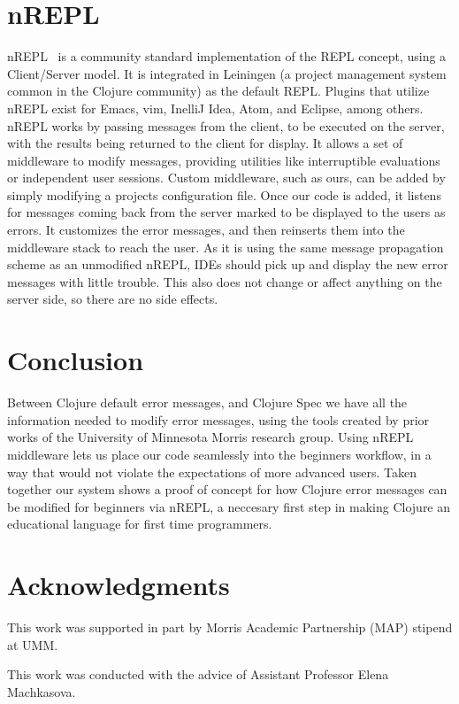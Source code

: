 \documentclass[12pt]{article}
\begin{document}
\section{nREPL}
nREPL~\cite{nrepl} is a community standard implementation of the REPL concept,
 using a
\newline
Client/Server model. It is integrated in Leiningen
 (a project management system common in the Clojure community) as the default REPL.
 Plugins that utilize nREPL exist for Emacs, vim, InelliJ Idea, Atom, and Eclipse,
among others.
nREPL works by passing messages from the client, to be executed on the server, with the results
being returned to the client for display.
It allows a set of middleware to modify messages, providing utilities
like interruptible evaluations or independent user sessions.
Custom middleware, such as ours, can be added by simply
modifying a projects configuration file. Once our code is added,
it listens for messages coming back from the server
marked to be displayed to the users as errors.
It customizes the error messages, and then reinserts them into the middleware stack
to reach the user. As it is using the same message propagation scheme as an unmodified nREPL,
IDEs should pick up and display the new error messages with little trouble.
This also does not change or affect anything on the server side, so there are no side effects.

\section{Conclusion}
Between Clojure default error messages, and Clojure Spec
we have all the information needed to modify error messages, using the
tools created by prior works of the University of Minnesota Morris research group. \cite{mics2017}
Using nREPL middleware lets us place our code seamlessly into the beginners
workflow, in a way that would not violate the expectations of more advanced users.
 Taken together our system shows a proof of concept for how Clojure
error messages can be modified for beginners via nREPL, a neccesary first step in making
Clojure an educational language for first time programmers.


\section{Acknowledgments}
This work was supported in part by Morris Academic Partnership (MAP) stipend at UMM.

This work was conducted with the advice of Assistant Professor Elena Machkasova.



\end{document}
